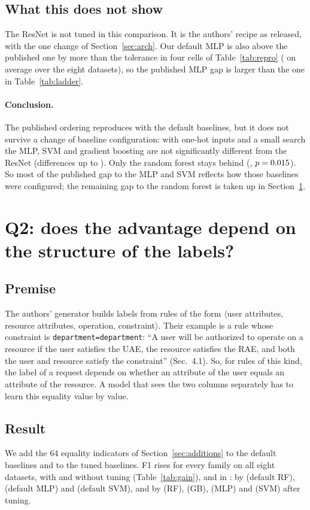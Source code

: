 \documentclass[11pt,a4paper]{article}
\begin{document}
\subsection{What this does not show}
The ResNet is not tuned in this comparison. It is the authors' recipe as released, with the one change of Section~\ref{sec:arch}. Our default MLP is also above the published one by more than the tolerance in four cells of Table~\ref{tab:repro} (\reproMlpGap{} on average over the eight datasets), so the published MLP gap is larger than the one in Table~\ref{tab:ladder}.

\paragraph{Conclusion.} The published ordering reproduces with the default baselines, but it does not survive a change of baseline configuration: with one-hot inputs and a small search the MLP, SVM and gradient boosting are not significantly different from the ResNet (differences up to \dSvmTunedU{}). Only the random forest stays behind (\dRfTuned{}, $p=0.015$). So most of the published gap to the MLP and SVM reflects how those baselines were configured; the remaining gap to the random forest is taken up in Section~\ref{sec:labels}.

\section{Q2: does the advantage depend on the structure of the labels?}\label{sec:labels}

\subsection{Premise}
The authors' generator builds labels from rules of the form $\langle$user attributes, resource attributes, operation, constraint$\rangle$. Their example is a rule whose constraint is \texttt{department=department}: ``A user will be authorized to operate on a resource if the user satisfies the UAE, the resource satisfies the RAE, and both the user and resource satisfy the constraint'' (Sec.~4.1). So, for rules of this kind, the label of a request depends on whether an attribute of the user equals an attribute of the resource. A model that sees the two columns separately has to learn this equality value by value.

\subsection{Result}
We add the 64 equality indicators of Section~\ref{sec:additions} to the default baselines and to the tuned baselines. F1 rises for every family on all eight datasets, with and without tuning (Table~\ref{tab:gain}), and in \seedOrderIndicators{}: by \gainDefRfU{} (default RF), \gainDefMlpU{} (default MLP) and \gainDefSvmU{} (default SVM), and by \gainRfU{} (RF), \gainGbU{} (GB), \gainMlpU{} (MLP) and \gainSvmU{} (SVM) after tuning.
\end{document}
